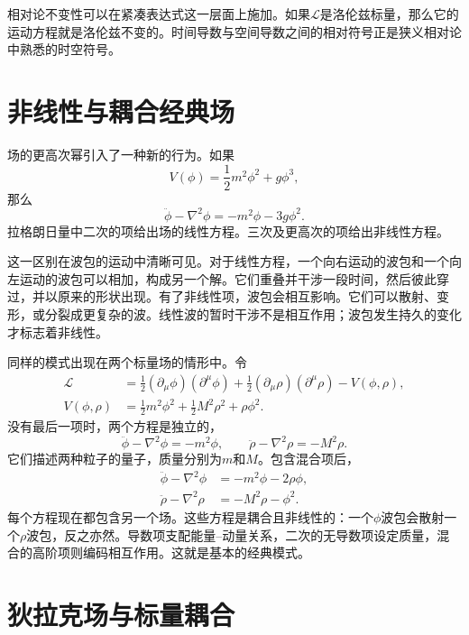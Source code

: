相对论不变性可以在紧凑表达式这一层面上施加。如果\(\mathcal L\)是洛伦兹标量，那么它的运动方程就是洛伦兹不变的。时间导数与空间导数之间的相对符号正是狭义相对论中熟悉的时空符号。

\section{非线性与耦合经典场}

场的更高次幂引入了一种新的行为。如果
\begin{equation}
V(\phi)=\frac12m^2\phi^2+g\phi^3,
\end{equation}
那么
\begin{equation}
\ddot\phi-\nabla^2\phi=-m^2\phi-3g\phi^2.
\end{equation}
拉格朗日量中二次的项给出场的线性方程。三次及更高次的项给出非线性方程。

这一区别在波包的运动中清晰可见。对于线性方程，一个向右运动的波包和一个向左运动的波包可以相加，构成另一个解。它们重叠并干涉一段时间，然后彼此穿过，并以原来的形状出现。有了非线性项，波包会相互影响。它们可以散射、变形，或分裂成更复杂的波。线性波的暂时干涉不是相互作用；波包发生持久的变化才标志着非线性。

同样的模式出现在两个标量场的情形中。令
\begin{align}
\mathcal L
&=
\frac12(\partial_\mu\phi)(\partial^\mu\phi)
+\frac12(\partial_\mu\rho)(\partial^\mu\rho)
-V(\phi,\rho),
\\
V(\phi,\rho)
&=
\frac12m^2\phi^2+\frac12M^2\rho^2+\rho\phi^2.
\end{align}
没有最后一项时，两个方程是独立的，
\begin{equation}
\ddot\phi-\nabla^2\phi=-m^2\phi,
\qquad
\ddot\rho-\nabla^2\rho=-M^2\rho.
\end{equation}
它们描述两种粒子的量子，质量分别为\(m\)和\(M\)。包含混合项后，
\begin{align}
\ddot\phi-\nabla^2\phi&=-m^2\phi-2\rho\phi,
\\
\ddot\rho-\nabla^2\rho&=-M^2\rho-\phi^2.
\end{align}
每个方程现在都包含另一个场。这些方程是耦合且非线性的：一个\(\phi\)波包会散射一个\(\rho\)波包，反之亦然。导数项支配能量--动量关系，二次的无导数项设定质量，混合的高阶项则编码相互作用。这就是基本的经典模式。

\section{狄拉克场与标量耦合}

